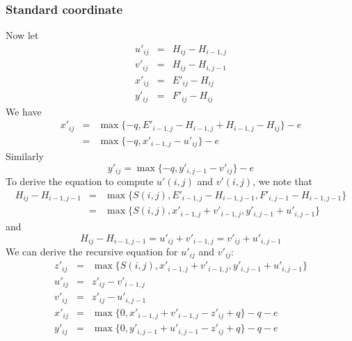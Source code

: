 \documentclass[10pt]{article}
\begin{document}
\subsubsection{Standard coordinate}
Now let
\begin{eqnarray*}
u'_{ij}&=&H_{ij}-H_{i-1,j}\\
v'_{ij}&=&H_{ij}-H_{i,j-1}\\
x'_{ij}&=&E'_{ij}-H_{ij}\\
y'_{ij}&=&F'_{ij}-H_{ij}
\end{eqnarray*}
We have
\begin{eqnarray}\label{eq:x}
x'_{ij}&=&\max\{-q,E'_{i-1,j}-H_{i-1,j}+H_{i-1,j}-H_{ij}\}-e\\\nonumber
&=&\max\{-q,x'_{i-1,j}-u'_{ij}\}-e
\end{eqnarray}
Similarly
\begin{equation}
y'_{ij}=\max\{-q,y'_{i,j-1}-v'_{ij}\}-e
\end{equation}
To derive the equation to compute $u'(i,j)$ and $v'(i,j)$, we note that
\begin{eqnarray*}
H_{ij}-H_{i-1,j-1}
&=&\max\{S(i,j),E'_{i-1,j}-H_{i-1,j-1},F'_{i,j-1}-H_{i-1,j-1}\}\\
&=&\max\{S(i,j),x'_{i-1,j}+v'_{i-1,j},y'_{i,j-1}+u'_{i,j-1}\}
\end{eqnarray*}
and
\[H_{ij}-H_{i-1,j-1}=u'_{ij}+v'_{i-1,j}=v'_{ij}+u'_{i,j-1}\]
We can derive the recursive equation for $u'_{ij}$ and $v'_{ij}$:
\begin{eqnarray*}
z'_{ij}&=&\max\{S(i,j),x'_{i-1,j}+v'_{i-1,j},y'_{i,j-1}+u'_{i,j-1}\}\\
u'_{ij}&=&z'_{ij}-v'_{i-1,j}\\
v'_{ij}&=&z'_{ij}-u'_{i,j-1}\\
x'_{ij}&=&\max\{0,x'_{i-1,j}+v'_{i-1,j}-z'_{ij}+q\}-q-e\\
y'_{ij}&=&\max\{0,y'_{i,j-1}+u'_{i,j-1}-z'_{ij}+q\}-q-e
\end{eqnarray*}
\end{document}
